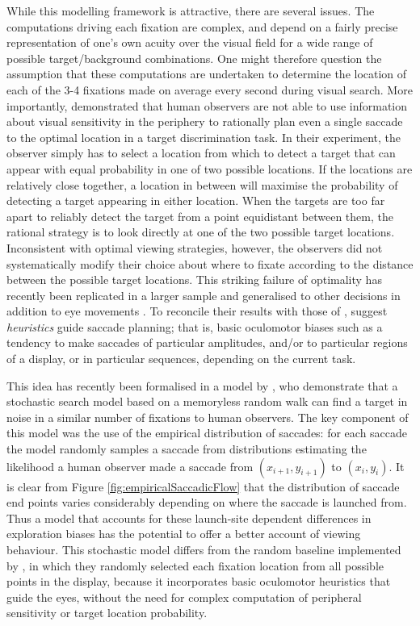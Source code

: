 While this modelling framework is attractive, there are several issues. The computations driving each fixation are complex, and depend on a fairly precise representation of one's own acuity over the visual field for a wide range of possible target/background combinations. One might therefore question the assumption that these computations are undertaken to determine the location of each of the 3-4 fixations made on average every second during visual search. More importantly,  \cite{morvan-maloney2012} demonstrated that human observers are not able to use information about visual sensitivity in the periphery to rationally plan even a single saccade to the optimal location in a target discrimination task. In their experiment, the observer simply has to select a location from which to detect a target that can appear with equal probability in one of two possible locations. If the locations are relatively close together, a location in between will maximise the probability of detecting a target appearing in either location. When the targets are too far apart to reliably detect the target from a point equidistant between them, the rational strategy is to look directly at one of the two possible target locations. Inconsistent with optimal viewing strategies, however, the observers did not systematically modify their choice about where to fixate according to the distance between the possible target locations. This striking failure of optimality has recently been replicated in a larger sample and generalised to other decisions in addition to eye movements  \citep{clarke-hunt2015}. To reconcile their results with those of  \cite{najemnik-geisler2008},  \cite{morvan-maloney2012} suggest \textit{heuristics} guide saccade planning; that is, basic oculomotor biases such as a tendency to make saccades of particular amplitudes, and/or to particular regions of a display, or in particular sequences, depending on the current task. 

This idea has recently been formalised in a model by \cite{clarke2016}, who demonstrate that a stochastic search model based on a memoryless random walk can find a target in noise in a similar number of fixations to human observers. The key component of this model was the use of the empirical distribution of saccades: for each saccade the model randomly samples a saccade from distributions estimating the likelihood a human observer made a saccade from $(x_{i+1},y_{i+1})$ to $(x_i,y_i)$. It is clear from Figure \ref{fig:empiricalSaccadicFlow} that the distribution of saccade end points varies considerably depending on where the saccade is launched from. Thus a model that accounts for these launch-site dependent differences in exploration biases has the potential to offer a better account of viewing behaviour. This stochastic model differs from the random baseline implemented by \cite{najemnik-geisler2008}, in which they randomly selected each fixation location from all possible points in the display, because it incorporates basic oculomotor heuristics that guide the eyes, without the need for complex computation of peripheral sensitivity or target location probability. 

